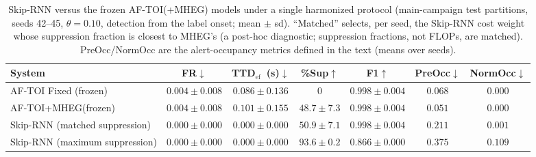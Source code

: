 \documentclass[a4paper,fleqn]{cas-dc}
\newcommand{\MHEG}{\mbox{MHEG}\xspace}
\begin{document}
{\begin{table}[!tbp]
\color{\revcolor}
\centering
\caption{Skip-RNN versus the frozen \mbox{AF-TOI}(+\MHEG) models under a
single harmonized protocol (main-campaign test partitions, seeds 42--45,
$\theta=0.10$, detection from the label onset; mean $\pm$ sd). ``Matched''
selects, per seed, the Skip-RNN cost weight whose suppression fraction is
closest to \MHEG's (a post-hoc diagnostic; suppression fractions, not FLOPs,
are matched). PreOcc/NormOcc are the alert-occupancy metrics defined in the
text (means over seeds).}
\label{tab:skiprnn}
\footnotesize
\setlength{\tabcolsep}{5pt}
\renewcommand{\arraystretch}{1.2}
\begin{tabular}{l c c c c c c}
\toprule
\textbf{System} & \textbf{FR}$\downarrow$ & \textbf{TTD$_{\mathrm{ef}}$~(s)}$\downarrow$
  & \textbf{\%Sup}$\uparrow$ & \textbf{F1}$\uparrow$
  & \textbf{PreOcc}$\downarrow$ & \textbf{NormOcc}$\downarrow$ \\
\midrule
\mbox{AF-TOI} Fixed (frozen)   & $0.004 \pm 0.008$ & $0.086 \pm 0.136$ & $0$ & $0.998 \pm 0.004$ & $0.068$ & $\mathbf{0.000}$ \\
\mbox{AF-TOI}+\MHEG (frozen)   & $0.004 \pm 0.008$ & $0.101 \pm 0.155$ & $48.7 \pm 7.3$ & $0.998 \pm 0.004$ & $\mathbf{0.051}$ & $\mathbf{0.000}$ \\
Skip-RNN (matched suppression) & $0.000 \pm 0.000$ & $0.000 \pm 0.000$ & $50.9 \pm 7.1$ & $0.998 \pm 0.004$ & $0.211$ & $0.001$ \\
Skip-RNN (maximum suppression) & $0.000 \pm 0.000$ & $0.000 \pm 0.000$ & $93.6 \pm 0.2$ & $0.866 \pm 0.000$ & $0.375$ & $0.109$ \\
\bottomrule
\end{tabular}
\end{table}
}
\end{document}
